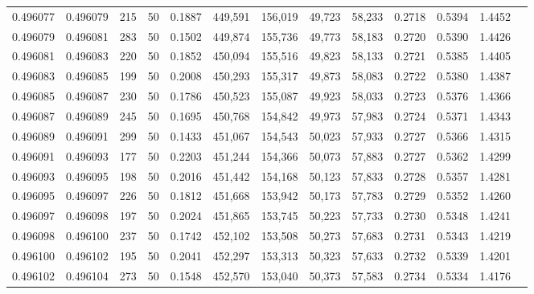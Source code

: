 \begin{tabular}{rrrrrrrrrrrrr}
0.496077 & 0.496079 &   215 &  50 &                                     0.1887 & 449,591 & 156,019 &  49,723 &  58,233 & 0.2718 & 0.5394 & 1.4452 \\
0.496079 & 0.496081 &   283 &  50 &                                     0.1502 & 449,874 & 155,736 &  49,773 &  58,183 & 0.2720 & 0.5390 & 1.4426 \\
0.496081 & 0.496083 &   220 &  50 &                                     0.1852 & 450,094 & 155,516 &  49,823 &  58,133 & 0.2721 & 0.5385 & 1.4405 \\
0.496083 & 0.496085 &   199 &  50 &                                     0.2008 & 450,293 & 155,317 &  49,873 &  58,083 & 0.2722 & 0.5380 & 1.4387 \\
0.496085 & 0.496087 &   230 &  50 &                                     0.1786 & 450,523 & 155,087 &  49,923 &  58,033 & 0.2723 & 0.5376 & 1.4366 \\
0.496087 & 0.496089 &   245 &  50 &                                     0.1695 & 450,768 & 154,842 &  49,973 &  57,983 & 0.2724 & 0.5371 & 1.4343 \\
0.496089 & 0.496091 &   299 &  50 &                                     0.1433 & 451,067 & 154,543 &  50,023 &  57,933 & 0.2727 & 0.5366 & 1.4315 \\
0.496091 & 0.496093 &   177 &  50 &                                     0.2203 & 451,244 & 154,366 &  50,073 &  57,883 & 0.2727 & 0.5362 & 1.4299 \\
0.496093 & 0.496095 &   198 &  50 &                                     0.2016 & 451,442 & 154,168 &  50,123 &  57,833 & 0.2728 & 0.5357 & 1.4281 \\
0.496095 & 0.496097 &   226 &  50 &                                     0.1812 & 451,668 & 153,942 &  50,173 &  57,783 & 0.2729 & 0.5352 & 1.4260 \\
0.496097 & 0.496098 &   197 &  50 &                                     0.2024 & 451,865 & 153,745 &  50,223 &  57,733 & 0.2730 & 0.5348 & 1.4241 \\
0.496098 & 0.496100 &   237 &  50 &                                     0.1742 & 452,102 & 153,508 &  50,273 &  57,683 & 0.2731 & 0.5343 & 1.4219 \\
0.496100 & 0.496102 &   195 &  50 &                                     0.2041 & 452,297 & 153,313 &  50,323 &  57,633 & 0.2732 & 0.5339 & 1.4201 \\
0.496102 & 0.496104 &   273 &  50 &                                     0.1548 & 452,570 & 153,040 &  50,373 &  57,583 & 0.2734 & 0.5334 & 1.4176 \\

\end{tabular}
